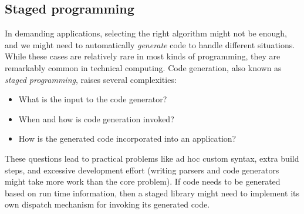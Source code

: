 



\subsection{Staged programming}

In demanding applications, selecting the right algorithm might not
be enough, and we might need to automatically \emph{generate} code
to handle different situations.
While these cases are relatively rare in most kinds of programming,
they are remarkably common in technical computing.
Code generation, also known as \emph{staged programming}, raises
several complexities:

\vspace{-3ex}
\begin{singlespace}
\begin{itemize}
\item What is the input to the code generator?
\item When and how is code generation invoked?
\item How is the generated code incorporated into an application?
\end{itemize}
\end{singlespace}

\noindent
These questions lead to practical problems like ad hoc custom syntax,
extra build steps, and excessive development effort (writing parsers and
code generators might take more work than the core problem).
If code needs to be generated based on run time information, then a
staged library might need to implement its own dispatch mechanism
for invoking its generated code.


